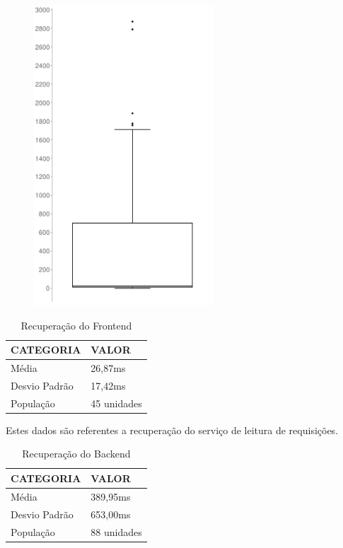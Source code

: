 \documentclass[12pt]{article}
\begin{document}
\begin{figure}[H]
\begin{minipage}[H]{0.5\textwidth}
        \includegraphics[width=0.6\textwidth]{picture/imagem2.png}
    \end{minipage}
\end{figure}

\begin{table}[H]
    \centering
    \caption{Recuperação do Frontend}
    \label{my-label}
    \begin{tabular}{|l|l|}
    \hline
    CATEGORIA     & VALOR      \\ \hline
    Média         & 26,87ms    \\ \hline
    Desvio Padrão & 17,42ms    \\ \hline
    População     & 45 unidades\\ \hline
    \end{tabular}
\end{table}

Estes dados são referentes a recuperação do serviço de leitura de requisições.

\begin{table}[H]
    \centering
    \caption{Recuperação do Backend}
    \label{my-label}
    \begin{tabular}{|l|l|}
    \hline
    CATEGORIA     & VALOR        \\ \hline
    Média         & 389,95ms     \\ \hline
    Desvio Padrão & 653,00ms     \\ \hline
    População     & 88 unidades  \\ \hline
    \end{tabular}
\end{table}
\end{document}
